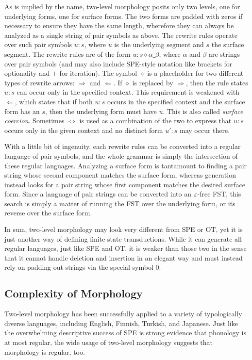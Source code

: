 As is implied by the name, two-level morphology posits only two levels, one for underlying forms, one for surface forms.
The two forms are padded with zeros if necessary to ensure they have the same length, wherefore they can always be analyzed as a single string of pair symbols as above.
The rewrite rules operate over such pair symbols $u:s$, where $u$ is the underlying segment and $s$ the surface segment.
The rewrite rules are of the form $u:s \diamond \alpha \_ \beta$, where $\alpha$ and $\beta$ are strings over pair symbols (and may also include SPE-style notation like brackets for optionality and $+$ for iteration).
The symbol $\diamond$ is a placeholder for two different types of rewrite arrows: $\Rightarrow$ and $\Leftarrow$.
If $\diamond$ is replaced by $\Rightarrow$, then the rule states $u:s$ can occur only in the specified context.
This requirement is weakened with $\Leftarrow$, which states that if both $u:s$ occurs in the specified context and the surface form has an $s$, then the underlying form must have $u$.
This is also called \emph{surface coercion}.
Sometimes $\Leftrightarrow$ is used as a combination of the two to express that $u:s$ occurs only in the given context and no distinct form $u':s$ may occur there.

With a little bit of ingenuity, each rewrite rules can be converted into a regular language of pair symbols, and the whole grammar is simply the intersection of these regular languages.
Analyzing a surface form is tantamount to finding a pair string whose second component matches the surface form, whereas generation instead looks for a pair string whose first component matches the desired surface form.
Since a language of pair strings can be converted into an $\varepsilon$-free FST, this search is simply a matter of running the FST over the underlying form, or its reverse over the surface form.

In sum, two-level morphology may look very different from SPE or OT, yet it is just another way of defining finite state transductions.
While it can generate all regular languages, just like SPE and OT, it is weaker than those two in the sense that it cannot handle deletion and insertion in an elegant way and must instead rely on padding out strings via the special symbol $0$.

\subsection{Complexity of Morphology}

Two-level morphology has been successfully applied to a variety of typologically diverse languages, including English, Finnish, Turkish, and Japanese.
Just like the overwhelming descriptive success of SPE is strong evidence that phonology is at most regular, the wide usage of two-level morphology suggests that morphology is regular, too.


